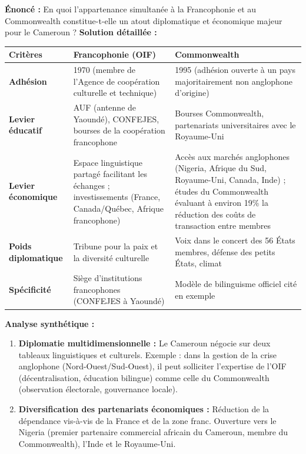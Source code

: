 \documentclass[11pt]{article}
\newcommand{\cle}[1]{{\popxbold\color{popdark}#1}}
\begin{document}
\begin{exoresolu}
    \textbf{Énoncé :} En quoi l'appartenance simultanée à la Francophonie et au Commonwealth constitue-t-elle un atout diplomatique et économique majeur pour le Cameroun ?
    \tcblower
    \textbf{Solution détaillée :}
    \begin{center}
    \begin{tabularx}{\linewidth}{|l|X|X|}\hline
    \rowcolor{popblueL} \textbf{Critères} & \textbf{Francophonie (OIF)} & \textbf{Commonwealth} \\ \hline
    \textbf{Adhésion} & 1970 (membre de l'Agence de coopération culturelle et technique) & 1995 (adhésion ouverte à un pays majoritairement non anglophone d'origine) \\ \hline
    \textbf{Levier éducatif} & AUF (antenne de Yaoundé), CONFEJES, bourses de la coopération francophone & Bourses Commonwealth, partenariats universitaires avec le Royaume-Uni \\ \hline
    \textbf{Levier économique} & Espace linguistique partagé facilitant les échanges ; investissements (France, Canada/Québec, Afrique francophone) & Accès aux marchés anglophones (Nigeria, Afrique du Sud, Royaume-Uni, Canada, Inde) ; études du Commonwealth évaluant à environ 19\% la réduction des coûts de transaction entre membres \\ \hline
    \textbf{Poids diplomatique} & Tribune pour la paix et la diversité culturelle & Voix dans le concert des 56 États membres, défense des petits États, climat \\ \hline
    \textbf{Spécificité} & Siège d'institutions francophones (CONFEJES à Yaoundé) & Modèle de \cle{bilinguisme officiel} cité en exemple \\ \hline
    \end{tabularx}
    \end{center}
    \textbf{Analyse synthétique :}
    \begin{enumerate}
        \item \textbf{Diplomatie multidimensionnelle :} Le Cameroun négocie sur deux tableaux linguistiques et culturels. Exemple : dans la gestion de la crise anglophone (Nord-Ouest/Sud-Ouest), il peut solliciter l'expertise de l'OIF (décentralisation, éducation bilingue) comme celle du Commonwealth (observation électorale, gouvernance locale).
        \item \textbf{Diversification des partenariats économiques :} Réduction de la dépendance vis-à-vis de la France et de la zone franc. Ouverture vers le \cle{Nigeria} (premier partenaire commercial africain du Cameroun, membre du Commonwealth), l'\cle{Inde} et le \cle{Royaume-Uni}.

\end{enumerate}
\end{exoresolu}
\end{document}
